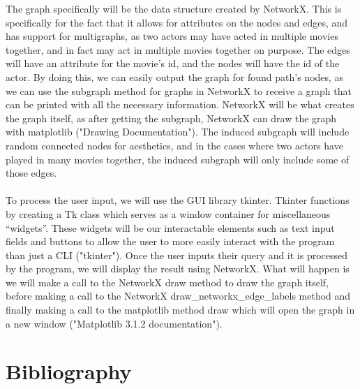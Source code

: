 \documentclass{article}
\begin{document}
The graph specifically will be the data structure created by NetworkX. This is specifically for the fact that it allows for attributes on the nodes and edges, and has support for multigraphs, as two actors may have acted in multiple movies together, and in fact may act in multiple movies together on purpose. The edges will have an attribute for the movie’s id, and the nodes will have the id of the actor. By doing this, we can easily output the graph for found path’s nodes, as we can use the subgraph method for graphs in NetworkX to receive a graph that can be printed with all the necessary information. NetworkX will be what creates the graph itself, as after getting the subgraph, NetworkX can draw the graph with matplotlib ("Drawing Documentation"). The induced subgraph will include random connected nodes for aesthetics, and in the cases where two actors have played in many movies together, the induced subgraph will only include some of those edges. \\\\
To process the user input, we will use the GUI library tkinter. Tkinter functions by creating a Tk class which serves as a window container for miscellaneous “widgets”. These widgets will be our interactable elements such as text input fields and buttons to allow the user to more easily interact with the program than just a CLI ("tkinter"). Once the user inputs their query and it is processed by the program, we will display the result using NetworkX. What will happen is we will make a call to the NetworkX draw method to draw the graph itself, before making a call to the NetworkX draw\_networkx\_edge\_labels method and finally making a call to the matplotlib method draw which will open the graph in a new window ("Matplotlib 3.1.2 documentation").

\section{Bibliography}
\end{document}
